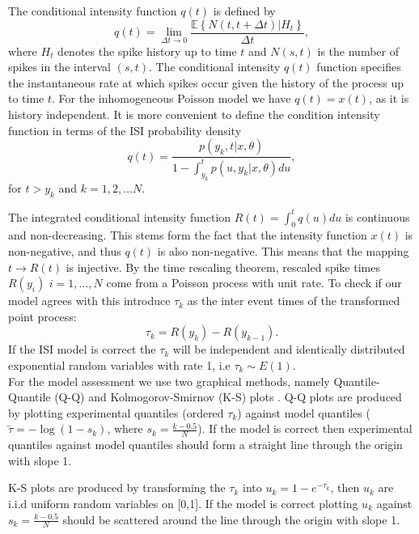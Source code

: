 \documentclass[../main.tex]{subfiles}
\begin{document}
The conditional intensity function $q(t)$ is defined by 
\begin{equation}
q(t) = \lim_{\Delta t \rightarrow 0}  \frac{\mathbb{E}\left\{ N\left( t, t+\Delta t \right) | H_t\right\} }{\Delta t},
\end{equation}
where $H_t$ denotes the spike history up to time $t$ and $N(s,t)$ is the number of spikes in the interval $(s,t)$. The conditional intensity $q(t)$ function specifies the instantaneous rate at which spikes occur given the history of the process up to time $t$. For the inhomogeneous Poisson model we have $q(t) = x(t)$, as it is history independent. 
It is more convenient to define the condition intensity function in terms of the ISI probability density
\begin{equation}
q(t) = \frac{p(y_k, t | x,\theta )}{1 - \int^t_{y_k} p(u,y_k | x, \theta) du},
\end{equation}   
for $t> y_k$ and $k = 1,2,\dots N$. \cite{IntFn, PP2}  

The integrated conditional intensity function $R(t) = \int^t_0 q(u) du$ is continuous and non-decreasing. This stems form the fact that the intensity function $x(t)$ is non-negative, and thus $q(t)$ is also non-negative. This means that the mapping $t \rightarrow R(t)$ is injective. By the time rescaling theorem, rescaled spike times $R(y_i)$ $i=1,\dots, N$ come from a Poisson process with unit rate. To check if our model agrees with this introduce $\tau_k$ as the inter event times of the transformed point process:
\begin{equation}
\tau_k = R(y_{k}) - R(y_{k-1}).
\end{equation}
If the ISI model is correct the $\tau_k$ will be independent and identically distributed exponential random variables with rate 1, i.e  $\tau_k \sim E(1)$. \cite{rescale, PP2} \\

For the model assessment we use two graphical methods, namely Quantile-Quantile (Q-Q) and Kolmogorov-Smirnov (K-S) plots \cite{rescale, KS}. Q-Q plots are produced by plotting experimental quantiles (ordered $\tau_k$) against model quantiles ($\tilde \tau = -\log (1-s_k)$, where $s_k = \frac{k-0.5}{N}$). If the model is correct then experimental quantiles against model quantiles should form a straight line through the origin with slope 1.

 K-S plots are produced by transforming the $\tau_k$ into $u_k = 1-e^{-\tau_k}$, then $u_k$ are i.i.d uniform random variables on [0,1]. If the model is correct plotting $u_k$ against $s_k = \frac{k-0.5}{N}$ should be scattered around the line through the origin with slope 1. %
 
\end{document}
